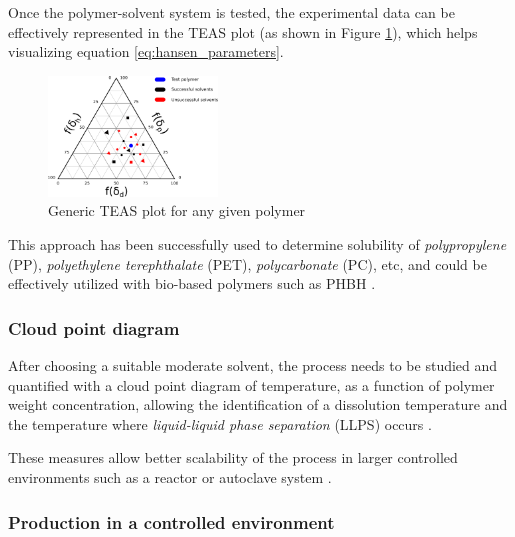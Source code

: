 \documentclass{article}
\begin{document}
    Once the polymer-solvent system is tested, the experimental data can be effectively represented in the TEAS plot (as shown in Figure \ref{fig:TEAS_plot}), which 
    helps visualizing equation \ref{eq:hansen_parameters}. 

    \begin{figure}[ht]
        \centering
        \includegraphics[width=0.4\textwidth]{Pictures/TEAS_plot.eps}
        \caption{Generic TEAS plot for any given polymer \autocites{DechetMaximilianA2020OtDo}}
        \label{fig:TEAS_plot}
    \end{figure}


    This approach has been successfully used to determine solubility of \textit{polypropylene} (PP), \textit{polyethylene terephthalate} (PET), 
    \textit{polycarbonate} (PC), etc, and could be effectively utilized with bio-based polymers such as PHBH \autocites{DechetMaximilianA2020OtDo}.
    
    

    \subsubsection{Cloud point diagram \label{Cloud_point_diagram}}

    After choosing a suitable moderate solvent, the process needs to be studied and quantified 
    with a cloud point diagram of temperature, as a function of polymer weight concentration, allowing the identification of a dissolution 
    temperature and the temperature where \textit{liquid-liquid phase separation} (LLPS) occurs \autocites{DechetMaximilianA2020OtDo}. 
    
    These measures allow better scalability of the process in larger controlled environments such as a reactor or autoclave system \autocite{DechetMaximilianA2020OtDo}.
    
    \subsubsection{Production in a controlled environment \label{precipitation_production_controlled_environment}}
\end{document}
